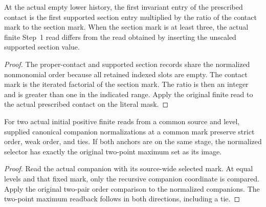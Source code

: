 \begin{theorem}
\label{hir:g1-initial-companion-section-order-ratio}
\leanok
At the actual empty lower history, the first invariant entry of
the prescribed contact is the first supported section entry
multiplied by the ratio of the contact mark to the section mark.
When the section mark is at least three, the actual finite Step~1
read differs from the read obtained by inserting the unscaled
supported section value.
\end{theorem}
\begin{proof}
The proper-contact and supported section records share the
normalized nonmonomial order because all retained indexed slots
are empty. The contact mark is the iterated factorial of the
section mark. The ratio is then an integer and is greater than
one in the indicated range. Apply the original finite read to
the actual prescribed contact on the literal mask.
\end{proof}

\begin{theorem}
\label{hir:g1-initial-positive-two-finite-centres}
\leanok
For two actual initial positive finite reads from a common
source and level, supplied canonical companion normalizations
at a common mark preserve strict order, weak order, and ties.
If both anchors are on the same stage, the normalized selector
has exactly the original two-point maximum set as its image.
\end{theorem}
\begin{proof}
Read the actual companion with its source-wide selected mark.
At equal levels and that fixed mark, only the recursive
companion coordinate is compared. Apply the original two-pair
order comparison to the normalized companions. The two-point
maximum readback follows in both directions, including a tie.
\end{proof}

